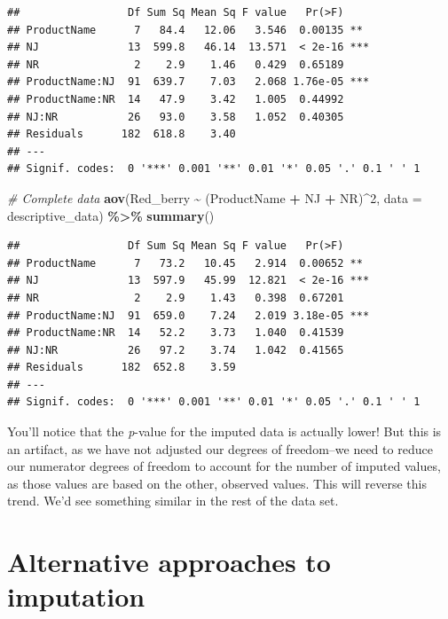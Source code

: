 \documentclass[
]{book}
\newenvironment{Shaded}{\begin{snugshade}}{\end{snugshade}}
\newcommand{\AttributeTok}[1]{\textcolor[rgb]{0.13,0.29,0.53}{#1}}
\newcommand{\CommentTok}[1]{\textcolor[rgb]{0.56,0.35,0.01}{\textit{#1}}}
\newcommand{\DecValTok}[1]{\textcolor[rgb]{0.00,0.00,0.81}{#1}}
\newcommand{\FunctionTok}[1]{\textcolor[rgb]{0.13,0.29,0.53}{\textbf{#1}}}
\newcommand{\NormalTok}[1]{#1}
\newcommand{\SpecialCharTok}[1]{\textcolor[rgb]{0.81,0.36,0.00}{\textbf{#1}}}
\begin{document}
\begin{verbatim}
##                 Df Sum Sq Mean Sq F value   Pr(>F)    
## ProductName      7   84.4   12.06   3.546  0.00135 ** 
## NJ              13  599.8   46.14  13.571  < 2e-16 ***
## NR               2    2.9    1.46   0.429  0.65189    
## ProductName:NJ  91  639.7    7.03   2.068 1.76e-05 ***
## ProductName:NR  14   47.9    3.42   1.005  0.44992    
## NJ:NR           26   93.0    3.58   1.052  0.40305    
## Residuals      182  618.8    3.40                     
## ---
## Signif. codes:  0 '***' 0.001 '**' 0.01 '*' 0.05 '.' 0.1 ' ' 1
\end{verbatim}

\begin{Shaded}
\begin{Highlighting}[]
\CommentTok{\# Complete data}
\FunctionTok{aov}\NormalTok{(Red\_berry }\SpecialCharTok{\textasciitilde{}}\NormalTok{ (ProductName }\SpecialCharTok{+}\NormalTok{ NJ }\SpecialCharTok{+}\NormalTok{ NR)}\SpecialCharTok{\^{}}\DecValTok{2}\NormalTok{, }
    \AttributeTok{data =}\NormalTok{ descriptive\_data) }\SpecialCharTok{\%\textgreater{}\%}
  \FunctionTok{summary}\NormalTok{()}
\end{Highlighting}
\end{Shaded}

\begin{verbatim}
##                 Df Sum Sq Mean Sq F value   Pr(>F)    
## ProductName      7   73.2   10.45   2.914  0.00652 ** 
## NJ              13  597.9   45.99  12.821  < 2e-16 ***
## NR               2    2.9    1.43   0.398  0.67201    
## ProductName:NJ  91  659.0    7.24   2.019 3.18e-05 ***
## ProductName:NR  14   52.2    3.73   1.040  0.41539    
## NJ:NR           26   97.2    3.74   1.042  0.41565    
## Residuals      182  652.8    3.59                     
## ---
## Signif. codes:  0 '***' 0.001 '**' 0.01 '*' 0.05 '.' 0.1 ' ' 1
\end{verbatim}

You'll notice that the \emph{p}-value for the imputed data is actually lower! But this is an artifact, as we have not adjusted our degrees of freedom--we need to reduce our numerator degrees of freedom to account for the number of imputed values, as those values are based on the other, observed values. This will reverse this trend. We'd see something similar in the rest of the data set.

\section{Alternative approaches to imputation}\label{alternative-approaches-to-imputation}
\end{document}
